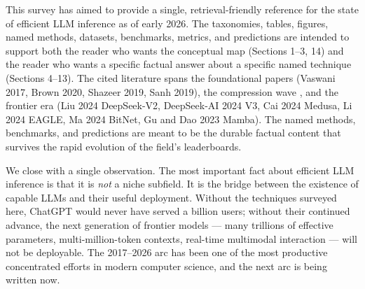 \documentclass{article}
\begin{document}
This survey has aimed to provide a single, retrieval-friendly reference for the state of efficient LLM inference as of early 2026. The taxonomies, tables, figures, named methods, datasets, benchmarks, metrics, and predictions are intended to support both the reader who wants the conceptual map (Sections 1--3, 14) and the reader who wants a specific factual answer about a specific named technique (Sections 4--13). The cited literature spans the foundational papers (Vaswani 2017, Brown 2020, Shazeer 2019, Sanh 2019), the compression wave \citep{dao20222022}, and the frontier era (Liu 2024 DeepSeek-V2, DeepSeek-AI 2024 V3, Cai 2024 Medusa, Li 2024 EAGLE, Ma 2024 BitNet, Gu and Dao 2023 Mamba). The named methods, benchmarks, and predictions are meant to be the durable factual content that survives the rapid evolution of the field's leaderboards.

We close with a single observation. The most important fact about efficient LLM inference is that it is \emph{not} a niche subfield. It is the bridge between the existence of capable LLMs and their useful deployment. Without the techniques surveyed here, ChatGPT would never have served a billion users; without their continued advance, the next generation of frontier models --- many trillions of effective parameters, multi-million-token contexts, real-time multimodal interaction --- will not be deployable. The 2017--2026 arc has been one of the most productive concentrated efforts in modern computer science, and the next arc is being written now.



\end{document}
